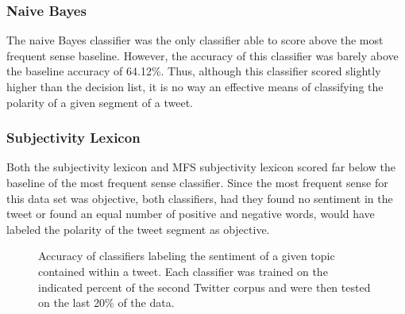 \documentclass[11pt]{article}
\begin{document}
\subsubsection{Naive Bayes}
The naive Bayes classifier was the only classifier able to score above the most frequent sense baseline. However, the accuracy of this classifier was barely above the baseline accuracy of 64.12\%. Thus, although this classifier scored slightly higher than the decision list, it is no way an effective means of classifying the polarity of a given segment of a tweet.

\subsubsection{Subjectivity Lexicon}
Both the subjectivity lexicon and MFS subjectivity lexicon scored far below the baseline of the most frequent sense classifier. Since the most frequent sense for this data set was objective, both classifiers, had they found no sentiment in the tweet or found an equal number of positive and negative words, would have labeled the polarity of the tweet segment as objective. 

\begin{figure}[htb!]
  \centering
  \caption{Accuracy of classifiers labeling the sentiment of a given topic contained within a tweet. Each classifier was trained on the indicated percent of the second Twitter corpus and were then tested on the last 20\% of the data.}
\end{figure}
\end{document}
